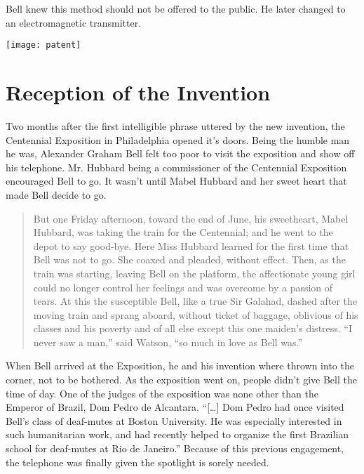 \documentclass[12pt singlecol]{article}
\newenvironment{Figure}
  {\par\medskip\noindent\minipage{\linewidth}}
  {\endminipage\par\medskip}
\begin{document}
\begin{flushleft}
\begin{multicols}{2}
Bell knew this method should not be offered to the public. He later changed to an electromagnetic transmitter. \cite[p.~2]{Coe95}

\begin{Figure}
	\centering
	\texttt{[image: patent]}
	\label{fig:patent}
\end{Figure}

\section{Reception of the Invention}

Two months after the first intelligible phrase uttered by the new invention, the Centennial Exposition in Philadelphia opened it's doors. Being the humble man he was, Alexander Graham Bell felt too poor to visit the exposition and show off his telephone. \cite[p.~35]{Casson10} Mr. Hubbard being a commissioner of the Centennial Exposition encouraged Bell to go. It wasn't until Mabel Hubbard and her sweet heart that made Bell decide to go.

\begin{quotation}
But one Friday afternoon, toward the end of June, his sweetheart, Mabel Hubbard, was taking the train for the Centennial; and he went to the depot to say good-bye. Here Miss Hubbard learned for the first time that Bell was not to go. She coaxed and pleaded, without effect. Then, as the train was starting, leaving Bell on the platform, the affectionate young girl could no longer control her feelings and was overcome by a passion of tears. At this the susceptible Bell, like a true Sir Galahad, dashed after the moving train and sprang aboard, without ticket of baggage, oblivious of his classes and his poverty and of all else except this one maiden's distress. ``I never saw a man,'' said Watson, ``so much in love as Bell was.'' \cite[p.~36]{Casson10}
\end{quotation}

When Bell arrived at the Exposition, he and his invention where thrown into the corner, not to be bothered. As the exposition went on, people didn't give Bell the time of day. One of the judges of the exposition was none other than the Emperor of Brazil, Dom Pedro de Alcantara. \cite[p.~38]{Casson10} ``[\ldots] Dom Pedro had once visited Bell's class of deaf-mutes at Boston University. He was especially interested in such humanitarian work, and had recently helped to organize the first Brazilian school for deaf-mutes at Rio de Janeiro.'' \cite[p.~38]{Casson10} Because of this previous engagement, the telephone was finally given the spotlight is sorely needed. 


\end{multicols}
\end{flushleft}
\end{document}
